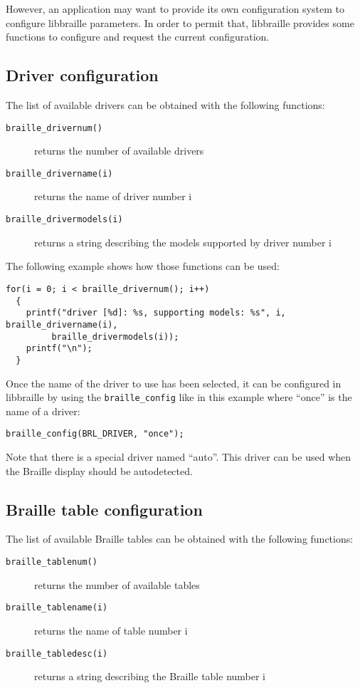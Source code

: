 \documentclass[12pt,a4paper]{article}
\begin{document}
However, an application may want to provide its own configuration
system to configure libbraille parameters. In order to permit that,
libbraille provides some functions to configure and request the
current configuration.

\subsection{Driver configuration}

The list of available drivers can be obtained with the following
functions:
\begin{description}
\item[{\tt braille\_drivernum()}] returns the number of available drivers
\item[{\tt braille\_drivername(i)}] returns the name of driver number
i
\item[{\tt braille\_drivermodels(i)}] returns a string describing the
models supported by driver number i
\end{description}

The following example shows how those functions can be used:
\begin{verbatim}
for(i = 0; i < braille_drivernum(); i++)
  {
    printf("driver [%d]: %s, supporting models: %s", i, braille_drivername(i),
	     braille_drivermodels(i));
    printf("\n");
  }
\end{verbatim}   

Once the name of the driver to use has been selected, it can be
configured in libbraille by using the {\tt braille\_config} like in
this example where ``once'' is the name of a driver:

\begin{verbatim}
braille_config(BRL_DRIVER, "once");
\end{verbatim}

Note that there is a special driver named ``auto''. This driver can be
used when the Braille display should be autodetected.

\subsection{Braille table configuration}

The list of available Braille tables can be obtained with the
following functions:
\begin{description}
\item[{\tt braille\_tablenum()}] returns the number of available
tables
\item[{\tt braille\_tablename(i)}] returns the name of table number i
\item[{\tt braille\_tabledesc(i)}] returns a string describing the
Braille table number i
\end{description}
\end{document}
